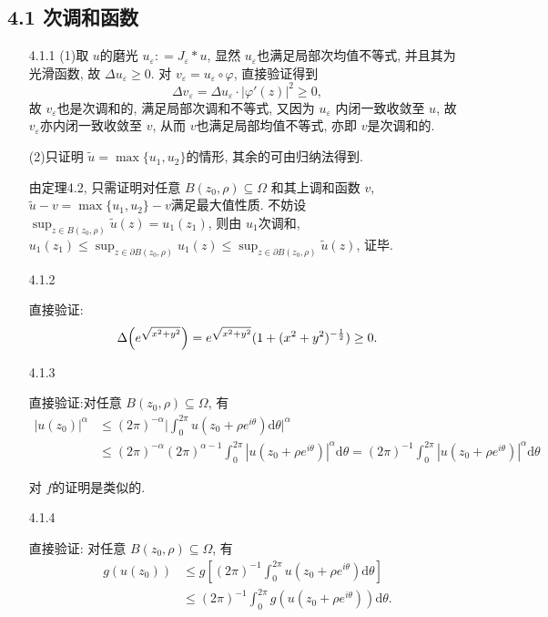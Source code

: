  \subsection*{4.1 次调和函数}
 \begin{itemize}
    \item[4.1.1]
 (1)取 $u$的磨光 $u_\varepsilon: = J_\varepsilon * u$, 
 显然 $u_\varepsilon$也满足局部次均值不等式, 并且其为光滑函数, 
 故 $\Delta u_\varepsilon \ge 0$.
 对 $v_\varepsilon = u_\varepsilon \circ \varphi$, 直接验证得到
 $$\Delta v_\varepsilon = \Delta  u_\varepsilon \cdot |\varphi'(z)|^2 \ge 0,$$
 故 $v_\varepsilon$也是次调和的, 满足局部次调和不等式, 
 又因为 $u_\varepsilon$ 内闭一致收敛至 $u$, 故 $v_\varepsilon$亦内闭一致收敛至 $v$, 
 从而 $v$也满足局部均值不等式, 亦即 $v$是次调和的.
 
(2)只证明 $\tilde{u} = \max\{u_1, u_2\}$的情形, 其余的可由归纳法得到.

 由定理4.2, 只需证明对任意 $B(z_0,\rho) \subseteq \Omega$ 和其上调和函数 $v$, 
 $\tilde{u}-v = \max\{u_1,u_2\}-v$满足最大值性质.
不妨设 $\sup_{z\in B(z_0,\rho)} \tilde{u}(z) = u_1(z_1)$, 
则由 $u_1$次调和, $u_1(z_1)\le \sup_{z\in \partial B(z_0,\rho)} u_1(z)
\le  \sup_{z\in \partial B(z_0,\rho)} \tilde{u}(z)$, 证毕.


    \item[4.1.2]

直接验证:
$$ \Delta \Bigl(e^{\sqrt{x^2+ y^2}}\Bigr) 
= e^{\sqrt{x^2+ y^2}}(1+ (x^2 + y^2)^{-\frac{1}{2}})\ge 0.$$

    \item[4.1.3]
 
直接验证:对任意 $B(z_0,\rho) \subseteq \Omega$, 有
\begin{align*}
    |u(z_0)|^\alpha &\le(2\pi)^{-\alpha}\Big|\int_{0}^{2\pi}
    u(z_0+\rho e^{i\theta})\mathrm{d}\theta\Big|^\alpha \\
    &\le (2\pi)^{-\alpha} (2\pi)^{\alpha-1} \int_{0}^{2\pi}
    |u(z_0+\rho e^{i\theta})|^\alpha\mathrm{d}\theta  
    =(2\pi)^{-1} \int_{0}^{2\pi}|u(z_0+\rho e^{i\theta})|^\alpha\mathrm{d}\theta 
\end{align*}

对 $f$的证明是类似的.


    \item[4.1.4]

直接验证: 对任意 $B(z_0,\rho) \subseteq \Omega$, 有
\begin{align*}
    g(u(z_0)) &\le g[(2\pi)^{-1}\int_{0}^{2\pi}u(z_0+\rho e^{i\theta})\mathrm{d}\theta] \\
    &\le (2\pi)^{-1} \int_{0}^{2\pi}g ( u(z_0+\rho e^{i\theta}))\mathrm{d}\theta .
\end{align*}


\end{itemize}
